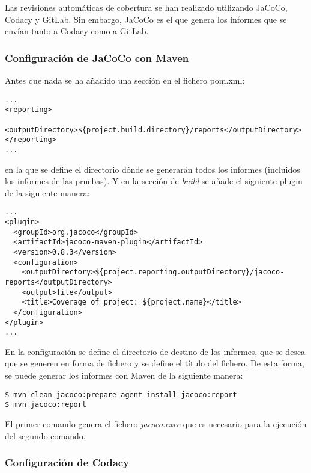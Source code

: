 Las revisiones automáticas de cobertura se han realizado utilizando JaCoCo, Codacy y GitLab. Sin embargo, JaCoCo es el que genera los informes que se envían tanto a Codacy como a GitLab.

\subsubsection{Configuración de JaCoCo con Maven}

Antes que nada se ha añadido una sección en el fichero pom.xml:\\
\begin{minipage}{\linewidth}
{\tiny
\begin{lstlisting}[breaklines]
...
<reporting>
  <outputDirectory>${project.build.directory}/reports</outputDirectory>
</reporting>
...
\end{lstlisting}
}
\end{minipage}
en la que se define el directorio dónde se generarán todos los informes (incluidos los informes de las pruebas). Y en la sección de \textit{build} se añade el siguiente plugin de la siguiente manera:\\
\begin{minipage}{\linewidth}
{\tiny
\begin{lstlisting}[breaklines]
...
<plugin>
  <groupId>org.jacoco</groupId>
  <artifactId>jacoco-maven-plugin</artifactId>
  <version>0.8.3</version>
  <configuration>
	<outputDirectory>${project.reporting.outputDirectory}/jacoco-reports</outputDirectory>
	<output>file</output>
	<title>Coverage of project: ${project.name}</title>
  </configuration>
</plugin>
...
\end{lstlisting}
}
\end{minipage}
En la configuración se define el directorio de destino de los informes, que se desea que se generen en forma de fichero y se define el título del fichero. De esta forma, se puede generar los informes con Maven de la siguiente manera:\\
\begin{minipage}{\linewidth}
{\tiny
\begin{lstlisting}[breaklines]
$ mvn clean jacoco:prepare-agent install jacoco:report
$ mvn jacoco:report
\end{lstlisting}
}
\end{minipage}

El primer comando genera el fichero \textit{jacoco.exec} que es necesario para la ejecución del segundo comando.

\subsubsection{Configuración de Codacy}

